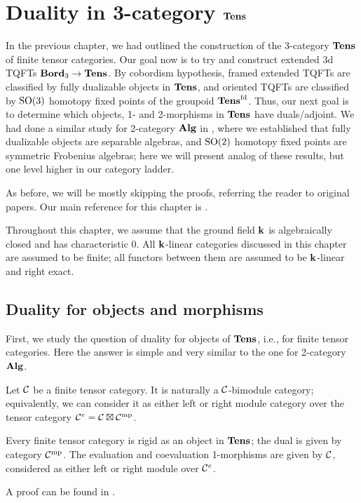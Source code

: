 \chapter{Duality in 3-category $\mathbf{Tens}$}\label{c:tens-dual}

In the previous chapter, we had outlined the construction of the 3-category
$\mathbf{Tens}$ of finite tensor categories. Our goal now is to try and construct
extended 3d TQFTs $\mathbf{Bord}_3\to \mathbf{Tens}$. By cobordism hypothesis, framed extended
TQFTs are classified by fully dualizable objects in $\mathbf{Tens}$, and oriented TQFTs
are classified by $\mathrm{SO}(3)$ homotopy fixed points of the groupoid $\mathbf{Tens}^{\mathrm{fd}}$.
Thus, our next goal is to determine which objects, 1- and 2-morphisms in
$\mathbf{Tens}$ have duals/adjoint. We had done a similar study for 2-category $\mathbf{Alg}$ in
, where we established that fully dualizable
objects are separable algebras, and $\mathrm{SO}(2)$ homotopy fixed points are symmetric
Frobenius algebras; here we will present analog of these results, but one level
higher in our category ladder.

As before, we will be mostly skipping the proofs, referring the reader to
original papers. Our main reference for this chapter is \cite{dsps-dualizable}.

Throughout this chapter, we assume that the ground field $\mathbf{k}$ is algebraically
closed and has characteristic 0. All $\mathbf{k}$-linear categories discussed in this
chapter are assumed to be finite; all functors between them are assumed to be
$\mathbf{k}$-linear and right exact.

\section{Duality for objects and morphisms}\label{s:duality-obj-mor}

First, we study the question of duality for objects of $\mathbf{Tens}$, i.e., for finite
tensor categories. Here the answer is simple and very similar to the one for
2-category $\mathbf{Alg}$.

Let $\mathcal{C}$ be a finite tensor category. It is naturally a $\mathcal{C}$-bimodule
category; equivalently, we can consider it as either left or right module
category over the tensor category $\mathcal{C}^e=\mathcal{C}\boxtimes\mathcal{C}^{\mathrm{mp}}$.

\begin{theorem}\label{t:tens-rigid}
  Every finite tensor category is rigid as an object in $\mathbf{Tens}$; the dual is
  given by category $\mathcal{C}^{\mathrm{mp}}$. The evaluation and coevaluation 1-morphisms
  are given by $\mathcal{C}$, considered as either left or right module over
  $\mathcal{C}^e$.
\end{theorem}
A proof can be found in \cite[Proposition 3.1.2]{dsps-dualizable}.

